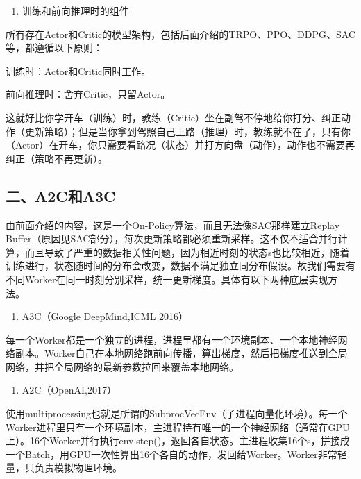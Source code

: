\begin{enumerate}
\def\labelenumi{\arabic{enumi}.}
\setcounter{enumi}{4}
\tightlist
\item
  训练和前向推理时的组件
\end{enumerate}

所有存在Actor和Critic的模型架构，包括后面介绍的TRPO、PPO、DDPG、SAC等，都遵循以下原则：

训练时：Actor和Critic同时工作。

前向推理时：舍弃Critic，只留Actor。

这就好比你学开车（训练）时，教练（Critic）坐在副驾不停地给你打分、纠正动作（更新策略）；但是当你拿到驾照自己上路（推理）时，教练就不在了，只有你（Actor）在开车，你只需要看路况（状态）并打方向盘（动作），动作也不需要再纠正（策略不再更新）。

\hypertarget{ux4e8ca2cux548ca3c}{%
\subsection{二、A2C和A3C}\label{ux4e8ca2cux548ca3c}}

由前面介绍的内容，这是一个On-Policy算法，而且无法像SAC那样建立Replay Buffer（原因见SAC部分），每次更新策略都必须重新采样。这不仅不适合并行计算，而且导致了严重的数据相关性问题，因为相近时刻的状态s也比较相近，随着训练进行，状态随时间的分布会改变，数据不满足独立同分布假设。故我们需要有不同Worker在同一时刻分别采样，统一更新梯度。具体有以下两种底层实现方法。

\begin{enumerate}
\def\labelenumi{\arabic{enumi}.}
\tightlist
\item
  A3C（Google DeepMind,ICML 2016）
\end{enumerate}

每一个Worker都是一个独立的进程，进程里都有一个环境副本、一个本地神经网络副本。Worker自己在本地网络跑前向传播，算出梯度，然后把梯度推送到全局网络，并把全局网络的最新参数拉回来覆盖本地网络。

\begin{enumerate}
\def\labelenumi{\arabic{enumi}.}
\setcounter{enumi}{1}
\tightlist
\item
  A2C（OpenAI,2017）
\end{enumerate}

使用multiprocessing也就是所谓的SubprocVecEnv（子进程向量化环境）。每一个Worker进程里只有一个环境副本，主进程持有唯一的一个神经网络（通常在GPU上）。16个Worker并行执行env.step()，返回各自状态。主进程收集16个s，拼接成一个Batch，用GPU一次性算出16个各自的动作，发回给Worker。Worker非常轻量，只负责模拟物理环境。

